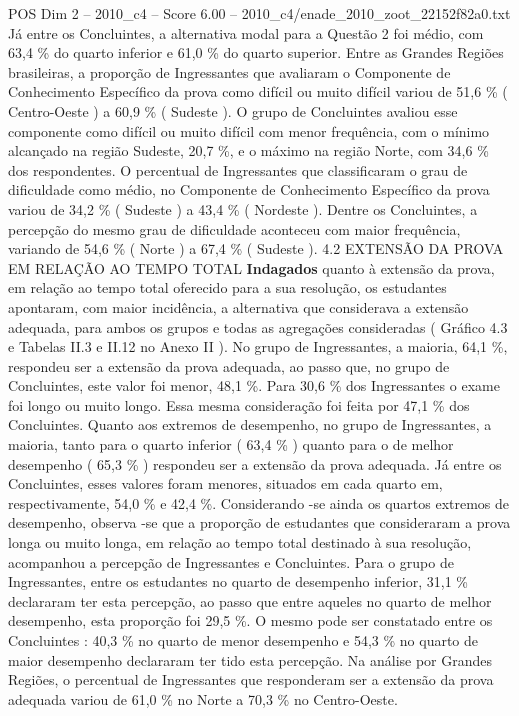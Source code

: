 \begin{textsample}{POS Dim 2 – 2010\_c4 – Score 6.00 – 2010\_c4/enade\_2010\_zoot\_22152f82a0.txt}
Já entre os Concluintes, a alternativa modal para a Questão 2 foi médio, com 63,4 \% do quarto inferior e 61,0 \% do quarto superior.
Entre as Grandes Regiões brasileiras, a proporção de Ingressantes que avaliaram o Componente de Conhecimento Específico da prova como difícil ou muito difícil variou de 51,6 \% ( Centro-Oeste ) a 60,9 \% ( Sudeste ).
O grupo de Concluintes avaliou esse componente como difícil ou muito difícil com menor frequência, com o mínimo alcançado na região Sudeste, 20,7 \%, e o máximo na região Norte, com 34,6 \% dos respondentes.
O percentual de Ingressantes que classificaram o grau de dificuldade como médio, no Componente de Conhecimento Específico da prova variou de 34,2 \% ( Sudeste ) a 43,4 \% ( Nordeste ).
Dentre os Concluintes, a percepção do mesmo grau de dificuldade aconteceu com maior frequência, variando de 54,6 \% ( Norte ) a 67,4 \% ( Sudeste ). 4.2 EXTENSÃO DA PROVA EM RELAÇÃO AO TEMPO TOTAL \textbf{Indagados} quanto à extensão da prova, em relação ao tempo total oferecido para a sua resolução, os estudantes apontaram, com maior incidência, a alternativa que considerava a extensão adequada, para ambos os grupos e todas as agregações consideradas ( Gráfico 4.3 e Tabelas II.3 e II.12 no Anexo II ).
No grupo de Ingressantes, a maioria, 64,1 \%, respondeu ser a extensão da prova adequada, ao passo que, no grupo de Concluintes, este valor foi menor, 48,1 \%.
Para 30,6 \% dos Ingressantes o exame foi longo ou muito longo.
Essa mesma consideração foi feita por 47,1 \% dos Concluintes.
Quanto aos extremos de desempenho, no grupo de Ingressantes, a maioria, tanto para o quarto inferior ( 63,4 \% ) quanto para o de melhor desempenho ( 65,3 \% ) respondeu ser a extensão da prova adequada.
Já entre os Concluintes, esses valores foram menores, situados em cada quarto em, respectivamente, 54,0 \% e 42,4 \%.
Considerando -se ainda os quartos extremos de desempenho, observa -se que a proporção de estudantes que consideraram a prova longa ou muito longa, em relação ao tempo total destinado à sua resolução, acompanhou a percepção de Ingressantes e Concluintes.
Para o grupo de Ingressantes, entre os estudantes no quarto de desempenho inferior, 31,1 \% declararam ter esta percepção, ao passo que entre aqueles no quarto de melhor desempenho, esta proporção foi 29,5 \%.
O mesmo pode ser constatado entre os Concluintes : 40,3 \% no quarto de menor desempenho e 54,3 \% no quarto de maior desempenho declararam ter tido esta percepção.
Na análise por Grandes Regiões, o percentual de Ingressantes que responderam ser a extensão da prova adequada variou de 61,0 \% no Norte a 70,3 \% no Centro-Oeste.

\end{textsample}
